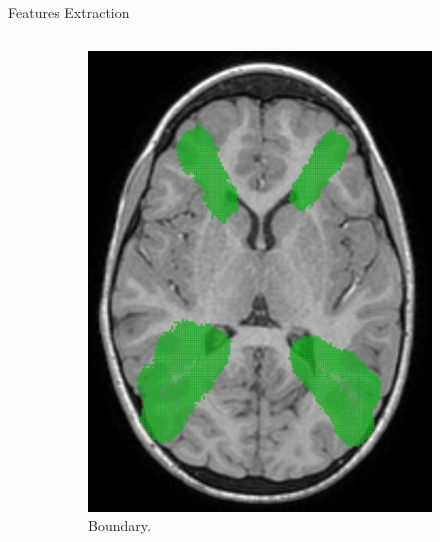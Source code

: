 \documentclass[]{standalone}
\begin{document}
\begin{frame}{Features Extraction}{}
\begin{columns}
\begin{column}{0.50\textwidth}
\begin{figure}[h!]
				\begin{subfigure}{0.4\textwidth}
					\centering
					\includegraphics[scale=0.07]{./IMG/boundary.jpg}
					\caption*{Boundary.}
				\end{subfigure}
				\hspace{15pt}
				\begin{subfigure}{0.4\textwidth}
					\centering

\end{subfigure}
\end{figure}
\end{column}
\end{columns}
\end{frame}
\end{document}
